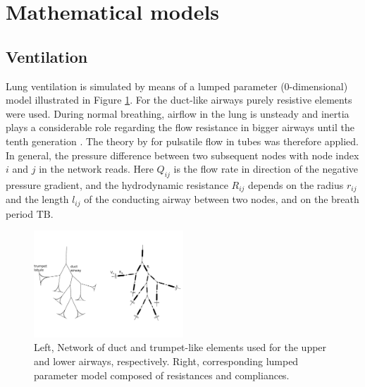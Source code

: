 \section{Mathematical models} \label{sec:mathematial_model}


\subsection{Ventilation} \label{ssec:ducts}
Lung ventilation is simulated by means of a lumped parameter (0-dimensional) model illustrated in Figure \ref{fig:lumpedparametermodel}.
For the duct-like airways purely resistive elements were used.
During normal breathing, airflow in the lung is unsteady and inertia plays a considerable role regarding the flow resistance in bigger airways until the tenth generation \citep{Kaczka2011}.
The theory by \citet{Womersley1957} for pulsatile flow in tubes was therefore applied.
In general, the pressure difference between two subsequent nodes with node index $i$ and $j$ in the network reads.
Here $Q_{ij}$ is the flow rate in direction of the negative pressure gradient, and the hydrodynamic resistance $R_{ij}$ depends on the radius $r_{ij}$ and the length $l_{ij}$ of the conducting airway between two nodes, and on the breath period $\mathrm{TB}$.

\begin{figure}[tb]
\centering
\includegraphics[width=0.5\textwidth]{figures/lumpedparametermodel}
\caption{Left, Network of duct and trumpet-like elements used for the upper and lower airways, respectively. Right, corresponding lumped parameter model composed of resistances and compliances.}
\label{fig:lumpedparametermodel}
\end{figure}


